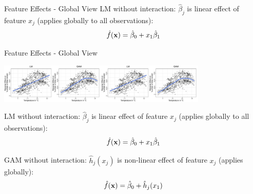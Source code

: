\documentclass[11pt,compress,t,notes=noshow, aspectratio=169, xcolor=table]{beamer}
\begin{document}
\begin{frame}{Feature Effects - Global View}
LM without interaction: $\hat\beta_j$ is linear effect of feature $x_j$ (applies globally to all observations):
$$\fh(\xv) = \hat\beta_0 + x_1\hat\beta_1$$ %


\end{frame}


\begin{frame}{Feature Effects - Global View}

\centering

\includegraphics[width=0.375\textwidth, trim=0cm 0.1cm 10.4cm 0cm, clip]{figure/lm_main_effects}\includegraphics[width=0.375\textwidth, trim=10cm 0.1cm 0.4cm 0cm, clip]{figure/lm_main_effects}

LM without interaction: $\hat\beta_j$ is linear effect of feature $x_j$ (applies globally to all observations):
$$\fh(\xv) = \hat\beta_0 + x_1\hat\beta_1$$%

GAM without interaction: $\hat{h}_j(x_j)$ is non-linear effect of feature $x_j$  (applies globally):
$$\fh(\xv) = \hat\beta_0 + \hat{h}_j(x_1)$$%

\end{frame}
\end{document}
